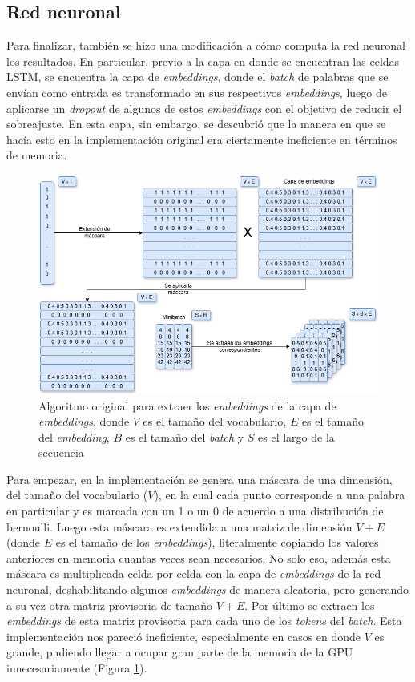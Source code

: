 \subsection{Red neuronal}

Para finalizar, también se hizo una modificación a cómo computa la red neuronal los resultados. En particular, previo a la capa en donde se encuentran las celdas LSTM, se encuentra la capa de \textit{embeddings}, donde el \textit{batch} de palabras que se envían como entrada es transformado en sus respectivos \textit{embeddings}, luego de aplicarse un \textit{dropout} de algunos de estos \textit{embeddings} con el objetivo de reducir el sobreajuste. En esta capa, sin embargo, se descubrió que la manera en que se hacía esto en la implementación original era ciertamente ineficiente en términos de memoria.

\begin{figure}[htb]
    \centering
    \includegraphics[width=1\textwidth]{imagenes/algoritmo_viejo.png}
    \caption{Algoritmo original para extraer los \textit{embeddings} de la capa de \textit{embeddings}, donde $V$ es el tamaño del vocabulario, $E$ es el tamaño del \textit{embedding}, $B$ es el tamaño del \textit{batch} y $S$ es el largo de la secuencia}
    \label{fig:algoritmo_viejo}
\end{figure}

Para empezar, en la implementación se genera una máscara de una dimensión, del tamaño del vocabulario ($V$), en la cual cada punto corresponde a una palabra en particular y es marcada con un 1 o un 0 de acuerdo a una distribución de bernoulli. Luego esta máscara es extendida a una matriz de dimensión $V + E$ (donde $E$ es el tamaño de los \textit{embeddings}), literalmente copiando los valores anteriores en memoria cuantas veces sean necesarios. No solo eso, además esta máscara es multiplicada celda por celda con la capa de \textit{embeddings} de la red neuronal, deshabilitando algunos \textit{embeddings} de manera aleatoria, pero generando a su vez otra matriz provisoria de tamaño $V + E$. Por último se extraen los \textit{embeddings} de esta matriz provisoria para cada uno de los \textit{tokens} del \textit{batch}. Esta implementación nos pareció ineficiente, especialmente en casos en donde $V$ es grande, pudiendo llegar a ocupar gran parte de la memoria de la GPU innecesariamente (Figura \ref{fig:algoritmo_viejo}).

